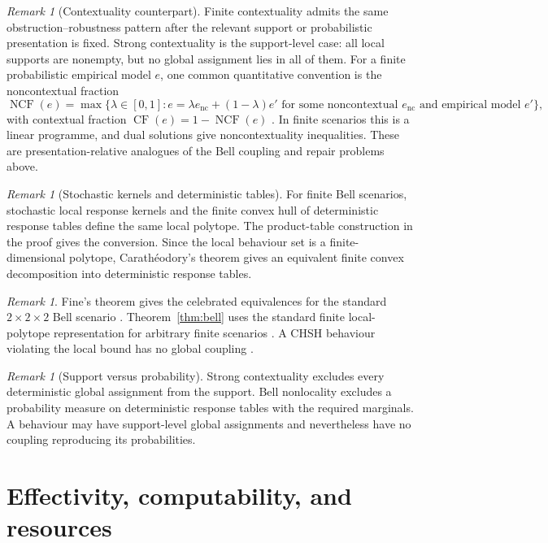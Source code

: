 \documentclass[11pt]{article}
\theoremstyle{plain}
\theoremstyle{definition}
\theoremstyle{remark}
\newtheorem{remark}[theorem]{Remark}
\begin{document}
\begin{remark}[Contextuality counterpart]
Finite contextuality admits the same obstruction--robustness pattern after the
relevant support or probabilistic presentation is fixed. Strong contextuality is
the support-level case: all local supports are nonempty, but no global assignment
lies in all of them. For a finite probabilistic empirical model \(e\), one common
quantitative convention is the noncontextual fraction
\[
\operatorname{NCF}(e)=
\max\{\lambda\in[0,1]: e=\lambda e_{\mathrm{nc}}+(1-\lambda)e'
\text{ for some noncontextual }e_{\mathrm{nc}}\text{ and empirical model }e'\},
\]
with contextual fraction \(\operatorname{CF}(e)=1-\operatorname{NCF}(e)\)
\cite{contextualfraction}. In finite scenarios this is a linear programme, and
dual solutions give noncontextuality inequalities. These are
presentation-relative analogues of the Bell coupling and repair problems above.
\end{remark}

\begin{remark}[Stochastic kernels and deterministic tables]
For finite Bell scenarios, stochastic local response kernels and the finite
convex hull of deterministic response tables define the same local polytope. The
product-table construction in the proof gives the conversion. Since the local
behaviour set is a finite-dimensional polytope, Carath\'eodory's theorem gives
an equivalent finite convex decomposition into deterministic response tables.
\end{remark}

\begin{remark}
Fine's theorem gives the celebrated equivalences for the standard
$2\times2\times2$ Bell scenario \cite{fine}. Theorem~\ref{thm:bell} uses the
standard finite local-polytope representation for arbitrary finite scenarios
\cite{pitowsky}. A CHSH behaviour violating the local bound has no global coupling
\cite{chsh}.
\end{remark}

\begin{remark}[Support versus probability]
Strong contextuality excludes every deterministic global assignment from the
support. Bell nonlocality excludes a probability measure on deterministic
response tables with the required marginals. A behaviour may have support-level
global assignments and nevertheless have no coupling reproducing its
probabilities.
\end{remark}

\section{Effectivity, computability, and resources}\label{sec:effect}
\end{document}
